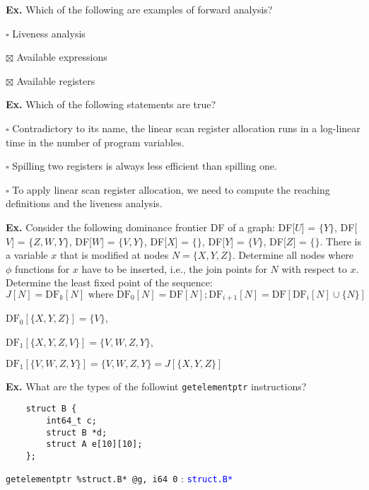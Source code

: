 \hrulefill

\textbf{Ex.} Which of the following are examples of forward analysis?
\begin{compactitem}
	\item[$\square$] Liveness analysis
	\item[$\boxtimes$] Available expressions
	\item[$\boxtimes$] Available registers
\end{compactitem}

\hrulefill

\textbf{Ex.} Which of the following statements are true?
\begin{compactitem}
	\item[$\square$] Contradictory to its name, the linear scan register allocation runs in a log-linear time in the number of program variables.
	\item[$\square$] Spilling two registers is always less efficient than spilling one.
	\item[$\square$] To apply linear scan register allocation, we need to compute the reaching definitions and the liveness analysis.
\end{compactitem}

\hrulefill

\textbf{Ex.} Consider the following dominance frontier DF of a graph:
DF[$ U $] = $\{ Y \}$,
DF[$ V $] = $\{ Z, W, Y \}$,
DF[$ W $] = $\{ V, Y \}$,
DF[$ X $] = $\{  \}$,
DF[$ Y $] = $\{ V \}$,
DF[$ Z $] = $\{  \}$.
There is a variable $x$ that is modified at nodes $N = \{X, Y, Z\}$. Determine all nodes
where $\phi$ functions for $x$ have to be inserted, i.e., the join points for $N$ with respect to $x$.
Determine the least fixed point of the sequence:
$$J[N] = \text{DF}_k[N] \text{ where } \text{DF}_0[N] = \text{DF}[N]; \text{DF}_{i+1}[N] = \text{DF}[\text{DF}_i[N] \cup \{N\}]$$\smallskip

$\text{DF}_0[\{X, Y, Z\}] = \{V\}$,

$\text{DF}_1[\{X, Y, Z, V\}] = \{V, W, Z, Y\}$,

$\text{DF}_1[\{V, W, Z, Y\}] = \{V, W, Z, Y\} = J[\{X, Y, Z\}]$

\hrulefill

\textbf{Ex.} What are the types of the followint \texttt{getelementptr} instructions?
\begin{lstlisting}
	struct B {
		int64_t c;
		struct B *d;
		struct A e[10][10];
	}; 
\end{lstlisting}

\texttt{getelementptr \%struct.B* @g, i64 0} : \textcolor{blue}{\texttt{struct.B*}}

